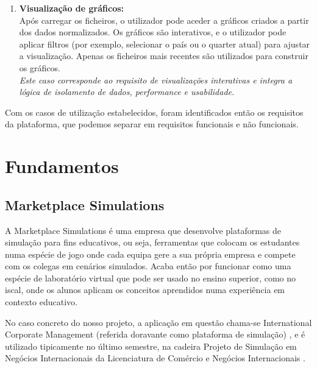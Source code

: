 \begin{enumerate}
    \item \textbf{Visualização de gráficos: } \\
    Após carregar os ficheiros, o utilizador pode aceder a gráficos criados a partir dos dados normalizados. Os gráficos são interativos, e o utilizador pode aplicar filtros (por exemplo, selecionar o país ou o quarter atual) para ajustar a visualização. Apenas os ficheiros mais recentes são utilizados para construir os gráficos. \\
    \textit{Este caso corresponde ao requisito de visualizações interativas e integra a lógica de isolamento de dados, performance e usabilidade.}
    
\end{enumerate}

Com os casos de utilização estabelecidos, foram identificados então os requisitos da plataforma, que podemos separar em requisitos funcionais e não funcionais.

\section{Fundamentos}
\label{sec:fundamentos}


\subsection{Marketplace Simulations}

A Marketplace Simulations  é uma empresa que desenvolve plataformas de simulação para fins educativos, ou seja, ferramentas que colocam os estudantes numa espécie de jogo onde cada equipa gere a sua própria empresa e compete com os colegas em cenários simulados. Acaba então por funcionar como uma espécie de laboratório virtual que pode ser usado no ensino superior, como no \gls{iscal}, onde os alunos aplicam os conceitos aprendidos numa experiência em contexto educativo.

No caso concreto do nosso projeto, a aplicação em questão chama-se International Corporate Management (referida doravante como plataforma de simulação) \cite{MarketplaceSim_2025}, e é utilizado tipicamente no último semestre, na cadeira Projeto de Simulação em Negócios Internacionais da Licenciatura de Comércio e Negócios Internacionais \cite{FUC_ISCAL_2025}. 

